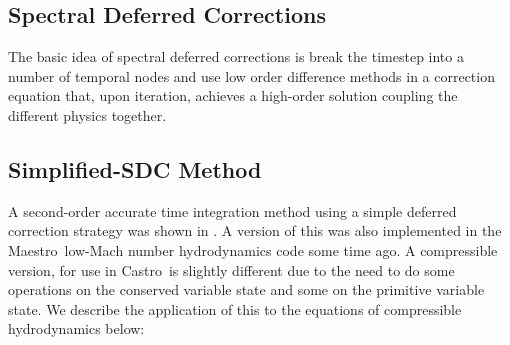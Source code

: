 \documentclass[times,modern]{aastex62}
\newcommand{\castro}{{\sf Castro}}
\newcommand{\maestro}{{\sf Maestro}}
\begin{document}
\subsection{Spectral Deferred Corrections}

The basic idea of spectral deferred corrections is break the timestep
into a number of temporal nodes and use low order difference methods
in a correction equation that, upon iteration, achieves a high-order
solution coupling the different physics together.


\subsection{Simplified-SDC Method}

A second-order accurate time integration method using a simple
deferred correction strategy was shown in \citep{SDC-old}.  A
version of this was also implemented in the \maestro\ low-Mach number
hydrodynamics code some time ago.  A compressible version, for use in
\castro\ is slightly different due to the need to do some operations
on the conserved variable state and some on the primitive variable
state.  We describe the application of this to the equations of
compressible hydrodynamics below:
\end{document}
